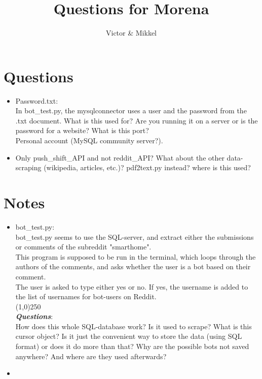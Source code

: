 \documentclass{article}
\begin{document}
\title{Questions for Morena}
\author{Victor \& Mikkel}

\maketitle

\section{Questions}
\begin{itemize}
	\item Password.txt: \\
    In bot\_test.py, the mysqlconnector uses a user and the password from the .txt document.
    What is this used for?
    Are you running it on a server or is the password for a website?
    What is this port? \\
    Personal account (MySQL community server?).
    \item Only push\_shift\_API and not reddit\_API? What about
	    the other data-scraping (wikipedia, articles, etc.)?
	pdf2text.py instead? where is this used?
\end{itemize}

\section{Notes}
\begin{itemize}
    \item bot\_test.py:\\
    bot\_test.py seems to use the SQL-server, and extract either the submissions or comments of the subreddit "smarthome". \\
    This program is supposed to be run in the terminal, which loops through the authors of the comments, and asks whether the user is a bot based on their comment. \\
    The user is asked to type either yes or no. If yes, the username is added to the list of usernames for bot-users on Reddit. \\
    \line(1,0){250}\\
    \textbf{\emph{Questions}}:\\
    How does this whole SQL-database work? Is it used to scrape? What is this cursor object? Is it just the convenient way to store the data (using SQL format) or does it do more than that?
    Why are the possible bots not saved anywhere? And where are they used afterwards?
    \item
\end{itemize}
\end{document}
